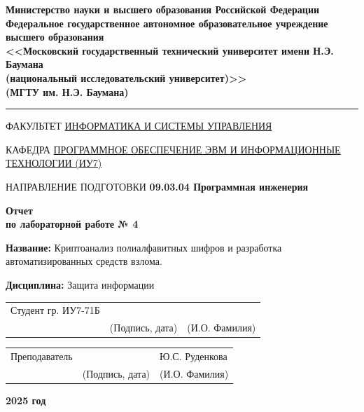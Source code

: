 \begin{titlepage}
\begin{center}

\textbf{Министерство науки и высшего образования Российской Федерации}\\
\textbf{Федеральное государственное автономное образовательное учреждение высшего образования}\\
\textbf{<<Московский государственный технический университет имени Н.Э. Баумана\\
(национальный исследовательский университет)>>}\\
\textbf{(МГТУ им. Н.Э. Баумана)}

\vspace{0.5cm}
\hrule
\vspace{0.5cm}

ФАКУЛЬТЕТ \underline{\hspace{1cm}ИНФОРМАТИКА И СИСТЕМЫ УПРАВЛЕНИЯ\hspace{1cm}}

КАФЕДРА \underline{\hspace{0.5cm}ПРОГРАММНОЕ ОБЕСПЕЧЕНИЕ ЭВМ И ИНФОРМАЦИОННЫЕ ТЕХНОЛОГИИ (ИУ7)\hspace{0.5cm}}

НАПРАВЛЕНИЕ ПОДГОТОВКИ \textbf{09.03.04 Программная инженерия}

\vspace{2cm}

\textbf{\Large Отчет}\\
\textbf{\Large по лабораторной работе № 4}

\vspace{1cm}

\textbf{Название:} \hspace{0.5cm} Криптоанализ полиалфавитных шифров и разработка\\
\hspace{3cm} автоматизированных средств взлома.

\vspace{0.5cm}

\textbf{Дисциплина:} \hspace{0.5cm} Защита информации

\vfill

\begin{tabular}{p{6cm}p{4cm}p{5cm}}
Студент гр. ИУ7-71Б & \underline{\hspace{3cm}} & \underline{\hspace{4cm}} \\
& \scriptsize{(Подпись, дата)} & \scriptsize{(И.О. Фамилия)}
\end{tabular}

\vspace{0.5cm}

\begin{tabular}{p{6cm}p{4cm}p{5cm}}
Преподаватель & \underline{\hspace{3cm}} & Ю.С. Руденкова \\
& \scriptsize{(Подпись, дата)} & \scriptsize{(И.О. Фамилия)}
\end{tabular}

\vspace{1cm}

\textbf{2025 год}

\end{center}
\end{titlepage}
